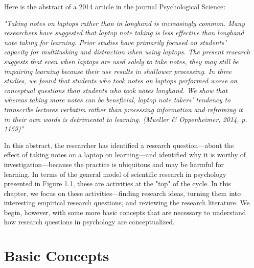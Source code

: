 

Here is the abstract of a 2014 article in the journal Psychological Science:

\emph{"Taking notes on laptops rather than in longhand is increasingly common. Many researchers have suggested that laptop note taking is less effective than longhand note taking for learning. Prior studies have primarily focused on students' capacity for multitasking and distraction when using laptops. The present research suggests that even when laptops are used solely to take notes, they may still be impairing learning because their use results in shallower processing. In three studies, we found that students who took notes on laptops performed worse on conceptual questions than students who took notes longhand. We show that whereas taking more notes can be beneficial, laptop note takers' tendency to transcribe lectures verbatim rather than processing information and reframing it in their own words is detrimental to learning. (Mueller \& Oppenheimer, 2014, p. 1159)"}


In this abstract, the researcher has identified a research question---about the effect of taking notes on a laptop on learning---and identified why it is worthy of investigation---because the practice is ubiquitous and may be harmful for learning. In terms of the general model of scientific research in psychology presented in Figure 1.1, these are activities at the "top" of the cycle. In this chapter, we focus on these activities---finding research ideas, turning them into interesting empirical research questions, and reviewing the research literature. We begin, however, with some more basic concepts that are necessary to understand how research questions in psychology are conceptualized.

\section{Basic Concepts}

